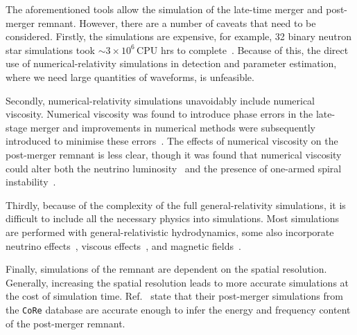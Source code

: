 \documentclass[../Thesis.tex]{subfiles}
\begin{document}
    The aforementioned tools allow the simulation of the late-time merger and post-merger remnant.
    However, there are a number of caveats that need to be considered.
    Firstly, the simulations are expensive, for example, 32 binary neutron star simulations took  $\sim 3\times 10^6\,$CPU hrs to complete~\cite{Takami2015}.
    Because of this, the direct use of numerical-relativity simulations in detection and parameter estimation, where we need large quantities of waveforms, is unfeasible. \par
    Secondly, numerical-relativity simulations unavoidably include numerical viscosity.
    Numerical viscosity was found to introduce phase errors in the late-stage merger and improvements in numerical methods were subsequently introduced to minimise these errors~\cite{Radice2014}.
    The effects of numerical viscosity on the post-merger remnant is less clear, though it was found that numerical viscosity could alter both the neutrino luminosity~\cite{Sekiguchi2016} and the presence of one-armed spiral instability~\cite{Radice2016}.\par

    Thirdly, because of the complexity of the full general-relativity simulations, it is difficult to include all the necessary physics into simulations.
    Most simulations are performed with general-relativistic hydrodynamics, some also incorporate neutrino effects~\cite[e.g.,][]{Sekiguchi2011,Perego2014,Foucart2016,Radice2016a,Zappa2018}, viscous effects~\cite[e.g.,][]{Shapiro2000,Duez2004, Radice2017,Shibata2017}, and magnetic fields~\cite[e.g.,][]{Duez2006,Duez2006a,Siegel2013,Siegel2014,Giacomazzo2011,Kiuchia2012,Giacomazzo2013,Kiuchi2014,Giacomazzo2015}. \par

    Finally, simulations of the remnant are dependent on the spatial resolution.
    Generally, increasing the spatial resolution leads to more accurate simulations at the cost of simulation time.
    Ref.~\cite{Dietrich2018} state that their post-merger simulations from  the \texttt{CoRe} database are accurate enough to infer the energy and frequency content of the post-merger remnant.
    
\end{document}

